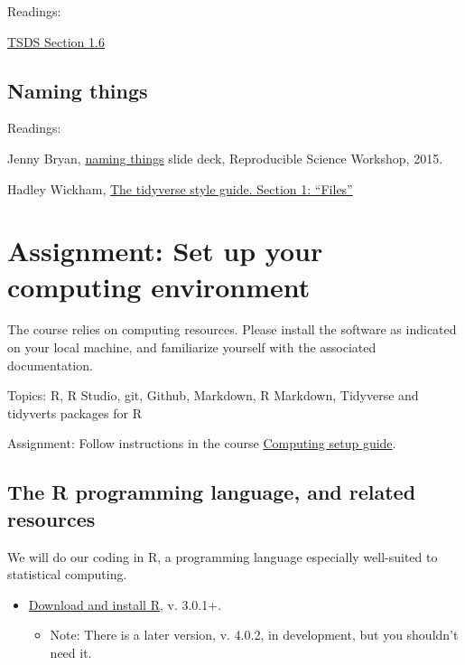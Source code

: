\documentclass[
]{book}
\providecommand{\tightlist}{%
  \setlength{\itemsep}{0pt}\setlength{\parskip}{0pt}}
\begin{document}
Readings:

\href{https://jhudatascience.org/tidyversecourse/intro.html\#data-science-project-organization}{TSDS Section 1.6}

\hypertarget{naming-things}{%
\section{Naming things}\label{naming-things}}

Readings:

Jenny Bryan, \href{https://speakerdeck.com/jennybc/how-to-name-files}{naming things} slide deck, Reproducible Science Workshop, 2015.

Hadley Wickham, \href{https://style.tidyverse.org/files.html\#names}{The tidyverse style guide. Section 1: ``Files''}

\hypertarget{assignment-set-up-your-computing-environment}{%
\chapter{Assignment: Set up your computing environment}\label{assignment-set-up-your-computing-environment}}

The course relies on computing resources. Please install the software as indicated on your local machine, and familiarize yourself with the associated documentation.

Topics: R, R Studio, git, Github, Markdown, R Markdown, Tidyverse and tidyverts packages for R

Assignment: Follow instructions in the course \href{https://github.com/uva-eng-time-series-sp21/sys5581-course-materials/blob/master/computing_setup_guide.pdf}{Computing setup guide}.

\hypertarget{the-r-programming-language-and-related-resources}{%
\section{The R programming language, and related resources}\label{the-r-programming-language-and-related-resources}}

We will do our coding in R, a programming language especially well-suited to statistical computing.

\begin{itemize}
\tightlist
\item
  \href{https://cran.rstudio.com/}{Download and install R}, v. 3.0.1+.

  \begin{itemize}
  \tightlist
  \item
    Note: There is a later version, v. 4.0.2, in development, but you shouldn't need it.
  \end{itemize}
\end{itemize}
\end{document}
